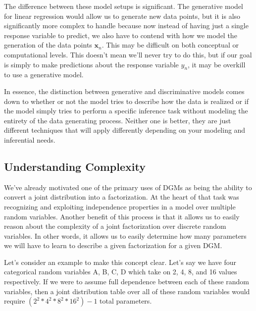 The difference between these model setups is significant. The generative model for linear regression would allow us to generate new data points, but it is also significantly more complex to handle because now instead of having just a single response variable to predict, we also have to contend with how we model the generation of the data points $\textbf{x}_n$. This may be difficult on both conceptual or computational levels. This doesn't mean we'll never try to do this, but if our goal is simply to make predictions about the response variable $y_n$, it may be overkill to use a generative model.

In essence, the distinction between generative and discriminative models comes down to whether or not the model tries to describe how the data is realized or if the model simply tries to perform a specific inference task without modeling the entirety of the data generating process. Neither one is better, they are just different techniques that will apply differently depending on your modeling and inferential needs.

\subsection{Understanding Complexity}
We've already motivated one of the primary uses of DGMs as being the ability to convert a joint distribution into a factorization. At the heart of that task was recognizing and exploiting independence properties in a model over multiple random variables. Another benefit of this process is that it allows us to easily reason about the complexity of a joint factorization over discrete random variables. In other words, it allows us to easily determine how many parameters we will have to learn to describe a given factorization for a given DGM.

Let's consider an example to make this concept clear. Let's say we have four categorical random variables A, B, C, D which take on 2, 4, 8, and 16 values respectively. If we were to assume full dependence between each of these random variables, then a joint distribution table over all of these random variables would require $(2^2 * 4^2 * 8^2 * 16^2) - 1$ total parameters.


